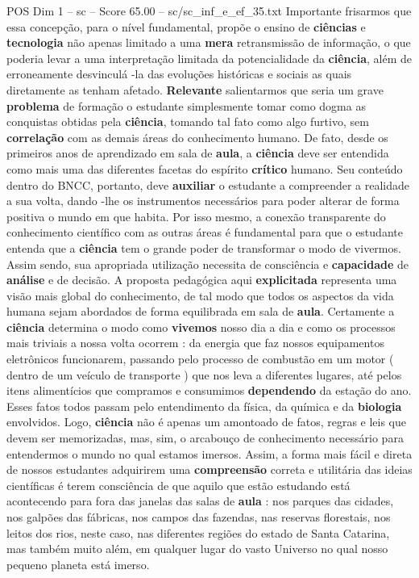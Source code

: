\begin{textsample}{POS Dim 1 – sc – Score 65.00 – sc/sc\_inf\_e\_ef\_35.txt}
Importante frisarmos que essa concepção, para o nível fundamental, propõe o ensino de \textbf{ciências} e \textbf{tecnologia} não apenas limitado a uma \textbf{mera} retransmissão de informação, o que poderia levar a uma interpretação limitada da potencialidade da \textbf{ciência}, além de erroneamente desvinculá -la das evoluções históricas e sociais as quais diretamente as tenham afetado. \textbf{Relevante} salientarmos que seria um grave \textbf{problema} de formação o estudante simplesmente tomar como dogma as conquistas obtidas pela \textbf{ciência}, tomando tal fato como algo furtivo, sem \textbf{correlação} com as demais áreas do conhecimento humano.
De fato, desde os primeiros anos de aprendizado em sala de \textbf{aula}, a \textbf{ciência} deve ser entendida como mais uma das diferentes facetas do espírito \textbf{crítico} humano.
Seu conteúdo dentro do BNCC, portanto, deve \textbf{auxiliar} o estudante a compreender a realidade a sua volta, dando -lhe os instrumentos necessários para poder alterar de forma positiva o mundo em que habita.
Por isso mesmo, a conexão transparente do conhecimento científico com as outras áreas é fundamental para que o estudante entenda que a \textbf{ciência} tem o grande poder de transformar o modo de vivermos.
Assim sendo, sua apropriada utilização necessita de consciência e \textbf{capacidade} de \textbf{análise} e de decisão.
A proposta pedagógica aqui \textbf{explicitada} representa uma visão mais global do conhecimento, de tal modo que todos os aspectos da vida humana sejam abordados de forma equilibrada em sala de \textbf{aula}.
Certamente a \textbf{ciência} determina o modo como \textbf{vivemos} nosso dia a dia e como os processos mais triviais a nossa volta ocorrem : da energia que faz nossos equipamentos eletrônicos funcionarem, passando pelo processo de combustão em um motor ( dentro de um veículo de transporte ) que nos leva a diferentes lugares, até pelos itens alimentícios que compramos e consumimos \textbf{dependendo} da estação do ano.
Esses fatos todos passam pelo entendimento da física, da química e da \textbf{biologia} envolvidos.
Logo, \textbf{ciência} não é apenas um amontoado de fatos, regras e leis que devem ser memorizadas, mas, sim, o arcabouço de conhecimento necessário para entendermos o mundo no qual estamos imersos.
Assim, a forma mais fácil e direta de nossos estudantes adquirirem uma \textbf{compreensão} correta e utilitária das ideias científicas é terem consciência de que aquilo que estão estudando está acontecendo para fora das janelas das salas de \textbf{aula} : nos parques das cidades, nos galpões das fábricas, nos campos das fazendas, nas reservas florestais, nos leitos dos rios, neste caso, nas diferentes regiões do estado de Santa Catarina, mas também muito além, em qualquer lugar do vasto Universo no qual nosso pequeno planeta está imerso.

\end{textsample}
